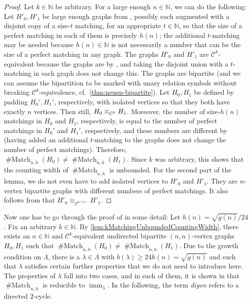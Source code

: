 \documentclass[10pt,a4paper]{article}
\theoremstyle{definition}
\theoremstyle{plain}
\theoremstyle{remark}
\newcommand{\Cc}{{\cal C}}
\newcommand{\bbN}{\mathbb{N}}
\DeclareMathOperator{\imm}{imm}
\DeclareMathOperator{\Match}{\# Match}
\begin{document}
\begin{proof}
	Let $k \in \bbN$ be arbitrary.
	For a large enough $n \in \bbN$, we can do the following:
	Let $H'_0, H'_1$ be large enough  graphs from \cite[Theorem~7.2]{dawar_symmetric_2025}, possibly each augmented with a disjoint copy of a size-$t$ matching, for an appropriate $t \in \bbN$, so that the size of a perfect matching in each of them is precisely $h(n)$; the additional $t$-matching may be needed because $h(n) \in \bbN$ is not necessarily a number that can be the size of a perfect matching in any  graph.
	The graphs $H'_0$ and $H'_1$ are $\mathcal{C}^k$-equivalent because the  graphs are by \cite[Theorem~7.2]{dawar_symmetric_2025}, and taking the disjoint union with a $t$-matching in each graph does not change this. The graphs are bipartite (and we can assume the bipartition to be marked with unary relation symbols without breaking $\mathcal{C}^k$-equivalence, cf.\ \cref{thm:neuen-bipartite}).
	Let $H_0, H_1$ be defined by padding $H_0', H_1'$, respectively, with isolated vertices so that they both have exactly $n$ vertices. 
	Then still, $H_0 \equiv_{\Cc^k} H_1$. Moreover, the number of size-$h(n)$ matchings in $H_0$ and $H_1$, respectively, is equal to the number of perfect matchings in $H_0'$ and $H_1'$, respectively, and these numbers are different by \cite{dawar_symmetric_2025} (having added an additional $t$-matching to the graphs does not change the number of perfect matchings).
	Therefore, $\Match_{n,h}(H_0) \neq \Match_{n,h}(H_1)$. Since $k$ was arbitrary, this shows that the counting width of $\Match_{n,h}$ is unbounded.
	For the second part of the lemma, we do not even have to add isolated vertices to $H'_0$ and $H'_1$. They are $n$-vertex bipartite graphs with different numbers of perfect matchings. It also follows from \cite{dawar_symmetric_2025} that $H'_0 \equiv_{\mathcal{C}^{o(n)}} H'_1$.
\end{proof}	
Now one has to go through the proof of \cite[Theorem 2]{curticapean2021complexitydichotomyimmanantfamilies} in some detail: Let $h(n) = \sqrt{g(n)}/24$.
Fix an arbitrary $k \in \bbN$.
By \cref{lem:kMatchingUnboundedCountingWidth}, there exists an $n \in \bbN$ and $\mathcal{C}^k$-equivalent undirected bipartite $(n,n)$-vertex graphs $H_0, H_1$ such that 
$\Match_{n,h}(H_0) \neq \Match_{n,h}(H_1)$. Due to the growth condition on $\Lambda$, there is a $\lambda \in \Lambda$ with $b(\lambda) \geq 24h(n) = \sqrt{g(n)}$ and such that $\lambda$ satisfies certain further properties that we do not need to introduce here. The properties of $\lambda$ fall into two cases, and in each of them, it is shown in \cite{curticapean2021complexitydichotomyimmanantfamilies} that $\Match_{n,h}$ is reducible to $\imm_{\lambda}$. 
In the following, the term \emph{digon} refers to a directed $2$-cycle.
\end{document}
